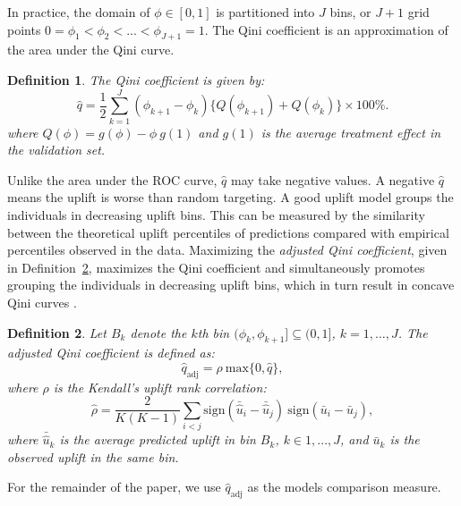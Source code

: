 \documentclass{article}
\def\qadj{\hat{q}_{\mathrm{adj}}}
\newtheorem{definition}{Definition}
\begin{document}
In practice, the domain of $\phi \in [0,1]$ is partitioned into $J$ bins, or $J+1$ grid points $0=\phi_1 < \phi_2 < ... < \phi_{J+1} = 1$. The Qini coefficient is an approximation of the area under the Qini curve.\\


\begin{definition}
    The {\it Qini coefficient} is given by:
\begin{equation}
  \hat{q} = \dfrac{1}{2} \sum_{k=1}^J (\phi_{k+1}-\phi_k)\{Q(\phi_{k+1}) + Q(\phi_{k})\} \times 100\%.
  \label{eq:q:hat}
\end{equation}
where $Q(\phi) = g(\phi) - \phi~g(1)$ and $g(1)$ is the average treatment effect in the validation set.
\end{definition}


Unlike the area under the ROC curve, $\hat{q}$ may take negative values. A negative $\hat q$ means the uplift is worse than random targeting. A good uplift model groups the individuals in decreasing uplift bins. This can be measured by the similarity between the theoretical uplift percentiles of  predictions compared with empirical percentiles observed in the data. Maximizing the \textit{adjusted Qini coefficient}, given in Definition~\ref{def:qadj}, maximizes the Qini coefficient and simultaneously promotes grouping the individuals in decreasing uplift bins, which in turn result in concave Qini curves \citep{belba2019qbased}.\\

\begin{definition}\label{def:qadj}
Let $B_k$ denote the  $k$th bin $(\phi_{k}, \phi_{k+1}] \subseteq (0,1]$, $k=1,\ldots, J$. The \textit{adjusted Qini coefficient} is defined as:
    \begin{equation}
        \qadj = \rho~\mathrm{max}\{ 0, \hat{q}\},
    \label{eq:qadj}
    \end{equation}
where $\rho$ is the {\it Kendall's uplift rank correlation}:
    \begin{equation}
        \hat{\rho} = \frac{2}{K(K-1)} \sum_{i<j} \mathrm{sign}(\bar{\hat{u}}_i - \bar{\hat{u}}_j)~\mathrm{sign}(\bar{u}_i - \bar{u}_j),
    \label{eq:corr_coeff}
    \end{equation}
where $\bar{\hat{u}}_k$ is the average predicted uplift in bin $B_k$,  $k \in {1,...,J}$, and $\bar{u}_k$ is the observed uplift in the same bin.
\end{definition}
For the remainder of the paper, we use $\qadj$ as the models comparison measure.
\end{document}
